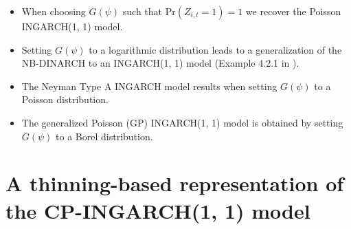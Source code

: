 \documentclass{article}
\begin{document}
\begin{itemize}
\item When choosing $G(\psi)$ such that $\text{Pr}(Z_{i,t} = 1) = 1$ we recover the Poisson INGARCH(1, 1) model.
\item Setting $G(\psi)$ to a logarithmic distribution %
leads to a generalization of the NB-DINARCH \cite{Xu2012} to an INGARCH(1, 1) model (Example 4.2.1 in \cite{Weiss2018}). %
\item The Neyman Type A INGARCH model \cite{Goncalves2015a} results when setting $G(\psi)$ to a Poisson distribution. %
\item The generalized Poisson (GP) INGARCH(1, 1) model \cite{Zhu2012} is obtained by setting $G(\psi)$ to a Borel distribution. %
\end{itemize}

\section{A thinning-based representation of the CP-INGARCH(1, 1) model}
\label{sec:alternative_formulation}
\end{document}
